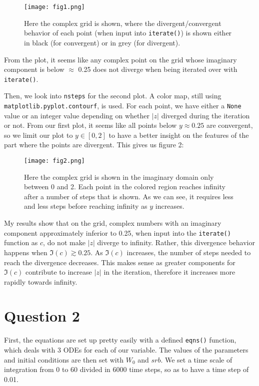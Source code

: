 \documentclass{article}
\begin{document}
\begin{figure}[h!]
  \centering
  \texttt{[image: fig1.png]}
  \caption{Here the complex grid is shown, where the divergent/convergent behavior of each point (when input into \texttt{iterate()}) is shown either in black (for convergent) or in grey (for divergent). }
\end{figure}


\break


From the plot, it seems like any complex point on the grid whose imaginary component is below $\approx$ 0.25 does not diverge when being iterated over with \texttt{iterate()}. 

Then, we look into \texttt{nsteps} for the second plot. A color map, still using \texttt{matplotlib.pyplot.contourf}, is used. For each point, we have either a \texttt{None} value or an integer value depending on whether $\lvert z \rvert$ diverged during the iteration or not. From our first plot, it seems like all points below $y \approx 0.25$ are convergent, so we limit our plot to $y \in [0, 2]$ to have a better insight on the features of the part where the points are divergent. This gives us figure 2:

\begin{figure}[h!]
    \centering
	\texttt{[image: fig2.png]}
	\caption{Here the complex grid is shown in the imaginary domain only between 0 and 2. Each point in the colored region reaches infinity after a number of steps that is shown. As we can see, it requires less and less steps before reaching infinity as $y$ increases.}
\end{figure}

My results show that on the grid, complex numbers with an imaginary component approximately inferior to 0.25, when input into the \texttt{iterate()} function as $c$, do not make $\lvert z \rvert$ diverge to infinity. Rather, this divergence behavior happens when $\Im(c) \gtrsim 0.25 $. As $\Im(c)$ increases, the number of steps needed to reach the divergence decreases. This makes sense as greater components for $\Im(c)$ contribute to increase $\lvert z \rvert$ in the iteration, therefore it increases more rapidly towards infinity.



\section*{Question 2}

First, the equations are set up pretty easily with a defined \texttt{eqns()} function, which deals with 3 ODEs for each of our variable. The values of the parameters and initial conditions are then set with $W_0$ and $srb$. We set a time scale of integration from 0 to 60 divided in 6000 time steps, so as to have a time step of 0.01.
\end{document}
